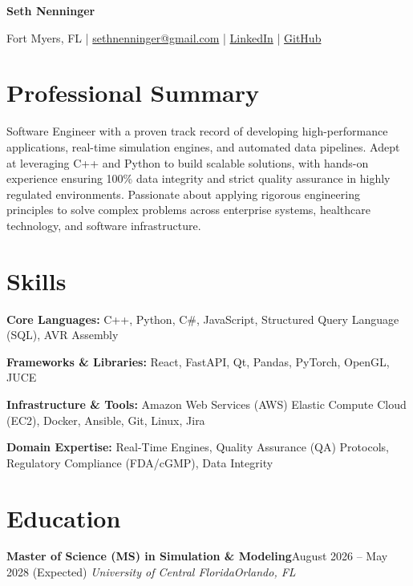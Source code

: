 \documentclass[letterpaper,11pt]{article}
\newcommand{\resumeEntry}[4]{
    \vspace{2pt}
    \noindent\textbf{#1}\hfill{#2}
    \newline
    \noindent\textit{#3}\hfill\textit{#4}
    \vspace{-3pt}
}
\begin{document}
\begin{center}
    \textbf{\Huge Seth Nenninger}
    \vspace{5pt}
    
    Fort Myers, FL \quad | \quad \href{mailto:sethnenninger@gmail.com}{sethnenninger@gmail.com} \quad | \quad \href{https://www.linkedin.com/in/seth-nenninger-bb3897178/}{LinkedIn} \quad |  \quad \href{https://github.com/salmon302}{GitHub}
\end{center}

\section{Professional Summary}
\vspace{1pt}
\noindent Software Engineer with a proven track record of developing high-performance applications, real-time simulation engines, and automated data pipelines. Adept at leveraging C++ and Python to build scalable solutions, with hands-on experience ensuring 100\% data integrity and strict quality assurance in highly regulated environments. Passionate about applying rigorous engineering principles to solve complex problems across enterprise systems, healthcare technology, and software infrastructure.

\section{Skills}
\vspace{3pt}
\noindent\textbf{Core Languages:} C++, Python, C\#, JavaScript, Structured Query Language (SQL), AVR Assembly
\vspace{5pt}

\noindent\textbf{Frameworks \& Libraries:} React, FastAPI, Qt, Pandas, PyTorch, OpenGL, JUCE
\vspace{5pt}

\noindent\textbf{Infrastructure \& Tools:} Amazon Web Services (AWS) Elastic Compute Cloud (EC2), Docker, Ansible, Git, Linux, Jira
\vspace{5pt}

\noindent\textbf{Domain Expertise:} Real-Time Engines, Quality Assurance (QA) Protocols, Regulatory Compliance (FDA/cGMP), Data Integrity
\vspace{5pt}

\section{Education}
    \resumeEntry
        {Master of Science (MS) in Simulation \& Modeling}
        {August 2026 – May 2028 (Expected)}
        {University of Central Florida}
        {Orlando, FL}
        
\end{document}
